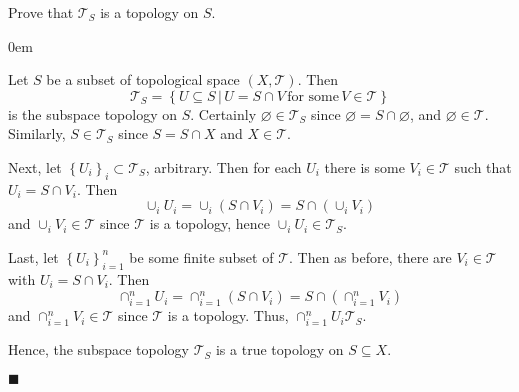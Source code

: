 \documentclass[12pt]{article}
\renewcommand{\qed}{\hfill$\blacksquare$}
\renewenvironment{proof}{\begin{addmargin}[1em]{0em}\begin{newproof}}{\end{newproof}\end{addmargin}\qed}
\newenvironment{exercise}[2][Exercise]{\begin{trivlist}
\item[\hskip \labelsep {\bfseries #1}\hskip \labelsep {\bfseries #2.}]}{\end{trivlist}}
\begin{document}
\begin{exercise}{3.1}
Prove that $\mathcal{T}_S$ is a topology on $S$.
\end{exercise}
\begin{proof}
Let $S$ be a subset of topological space $\left(X,\mathcal{T}\right)$. Then $$\mathcal{T}_S = \left\{ U\subseteq S \, | \, U=S\cap V \, \text{for some} \, V\in \mathcal{T}\right\}$$ is the subspace topology on $S$. Certainly $\varnothing\in \mathcal{T}_S$ since $\varnothing = S\cap \varnothing$, and $\varnothing \in \mathcal{T}$. Similarly, $S\in \mathcal{T}_S$ since $S=S\cap X$ and $X \in \mathcal{T}$.

Next, let $\left\{U_i\right\}_i \subset \mathcal{T}_S$, arbitrary. Then for each $U_i$ there is some $V_i\in \mathcal{T}$ such that $U_i = S\cap V_i$. Then $$ \cup_i U_i = \cup_i \left(S\cap V_i\right) = S \cap \left( \cup_i V_i\right) $$ and $\cup_i V_i \in \mathcal{T}$ since $\mathcal{T}$ is a topology, hence $\cup_i U_i \in \mathcal{T}_S$.

Last, let $\left\{U_i\right\}_{i=1}^n$ be some finite subset of $\mathcal{T}$. Then as before, there are $V_i \in \mathcal{T}$ with $U_i = S\cap V_i$. Then 
$$ \cap_{i=1}^n U_i = \cap_{i=1}^n \left(S\cap V_i\right) = S\cap \left(\cap_{i=1}^n V_i\right) $$ and $\cap_{i=1}^n V_i \in \mathcal{T}$ since $\mathcal{T}$ is a topology. Thus, $\cap_{i=1}^n U_i \mathcal{T}_S$.

Hence, the subspace topology $\mathcal{T}_S$ is a true topology on $S\subseteq X$.
\end{proof}
\end{document}
